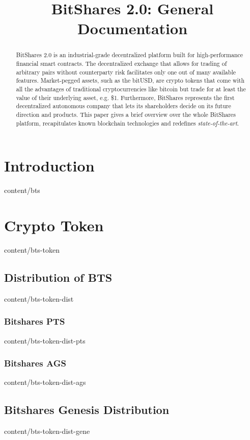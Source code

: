 \documentclass{btswhitepaper}
\title{BitShares 2.0: General Documentation}
\begin{document}
\maketitle

\begin{abstract}%
 BitShares 2.0 is an industrial-grade decentralized platform built for
 high-performance financial smart contracts. The decentralized exchange that
 allows for trading of arbitrary pairs without counterparty risk facilitates
 only one out of many available features. Market-pegged assets, such as the
 bitUSD, are crypto tokens that come with all the advantages of traditional
 cryptocurrencies like bitcoin but trade for at least the value of their
 underlying asset, e.g. \$1. Furthermore, BitShares represents the first
 decentralized autonomous company that lets its shareholders decide on its
 future direction and products. This paper gives a brief overview over the
 whole BitShares platform, recapitulates known blockchain technologies and
 redefines \emph{state-of-the-art}.
\end{abstract}

\section       { Introduction                      }  { content/bts                 } 

\section       { Crypto Token                      }  { content/bts-token           } 
\subsection    { Distribution of BTS               }  { content/bts-token-dist      } 
\subsubsection { Bitshares PTS                     }  { content/bts-token-dist-pts  } 
\subsubsection { Bitshares AGS                     }  { content/bts-token-dist-ags  } 
\subsection    { Bitshares Genesis Distribution    }  { content/bts-token-dist-gene } 
\end{document}

